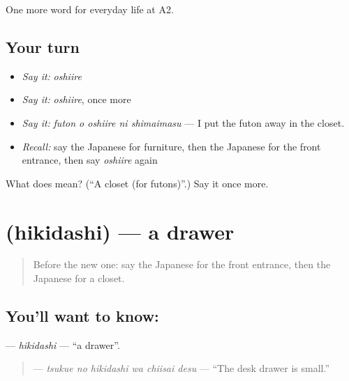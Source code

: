 \begin{grammarlens}[title={What you've built}]
One more word for everyday life at A2.
\end{grammarlens}

\subsection*{Your turn}
\begin{itemize}
\raggedright
  \item \emph{Say it:} \emph{oshiire}
  \item \emph{Say it:} \emph{oshiire}, once more
  \item \emph{Say it:} \emph{futon o oshiire ni shimaimasu} — I put the futon away in the closet.
  \item \emph{Recall:} say the Japanese for furniture, then the Japanese for the front entrance, then say \emph{oshiire} again
\end{itemize}

\begin{tcolorbox}[breakable,colback=teal!4,colframe=teal!35!black,title={Before you move on}]
What does  mean? (\textquotedblleft{}A closet (for futons)\textquotedblright{}.) Say it once more.
\end{tcolorbox}
\section[\texorpdfstring{\ja{ひきだし} (hikidashi)}{ひきだし (hikidashi)}]{ (hikidashi) — a drawer}

\label{lesson:JA-C156-hikidashi}



\begin{quote}
Before the new one: say the Japanese for the front entrance, then the Japanese for a closet.
\end{quote}

\subsection*{You'll want to know: }
\textbf{} — \emph{hikidashi} — \textquotedblleft{}a drawer\textquotedblright{}.

\begin{quote}
\textbf{  } — \emph{tsukue no hikidashi wa chiisai desu} — \textquotedblleft{}The desk drawer is small.\textquotedblright{}
\end{quote}

